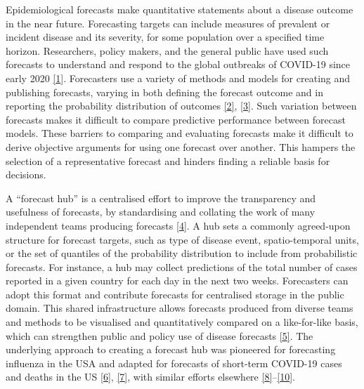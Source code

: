 \documentclass[
]{article}
\begin{document}
Epidemiological forecasts make quantitative statements about a disease
outcome in the near future. Forecasting targets can include measures of
prevalent or incident disease and its severity, for some population over
a specified time horizon. Researchers, policy makers, and the general
public have used such forecasts to understand and respond to the global
outbreaks of COVID-19 since early 2020
\protect\hyperlink{ref-basshuysenThreeWaysWhich2021}{{[}1{]}}.
Forecasters use a variety of methods and models for creating and
publishing forecasts, varying in both defining the forecast outcome and
in reporting the probability distribution of outcomes
\protect\hyperlink{ref-zelnerAccountingUncertaintyPandemic2021}{{[}2{]}},
\protect\hyperlink{ref-jamesUseMisuseMathematical2021}{{[}3{]}}. Such
variation between forecasts makes it difficult to compare predictive
performance between forecast models. These barriers to comparing and
evaluating forecasts make it difficult to derive objective arguments for
using one forecast over another. This hampers the selection of a
representative forecast and hinders finding a reliable basis for
decisions.

A ``forecast hub'' is a centralised effort to improve the transparency
and usefulness of forecasts, by standardising and collating the work of
many independent teams producing forecasts
\protect\hyperlink{ref-reichCollaborativeMultiyearMultimodel2019}{{[}4{]}}.
A hub sets a commonly agreed-upon structure for forecast targets, such
as type of disease event, spatio-temporal units, or the set of quantiles
of the probability distribution to include from probabilistic forecasts.
For instance, a hub may collect predictions of the total number of cases
reported in a given country for each day in the next two weeks.
Forecasters can adopt this format and contribute forecasts for
centralised storage in the public domain. This shared infrastructure
allows forecasts produced from diverse teams and methods to be
visualised and quantitatively compared on a like-for-like basis, which
can strengthen public and policy use of disease forecasts
\protect\hyperlink{ref-cdcCoronavirusDisease20192020}{{[}5{]}}. The
underlying approach to creating a forecast hub was pioneered for
forecasting influenza in the USA and adapted for forecasts of short-term
COVID-19 cases and deaths in the US
\protect\hyperlink{ref-cramerUnitedStatesCOVID192021}{{[}6{]}},
\protect\hyperlink{ref-rayEnsembleForecastsCoronavirus2020e}{{[}7{]}},
with similar efforts elsewhere
\protect\hyperlink{ref-bracherPreregisteredShorttermForecasting2021}{{[}8{]}}--\protect\hyperlink{ref-bicherSupportingCOVID19PolicyMaking2021}{{[}10{]}}.
\end{document}
